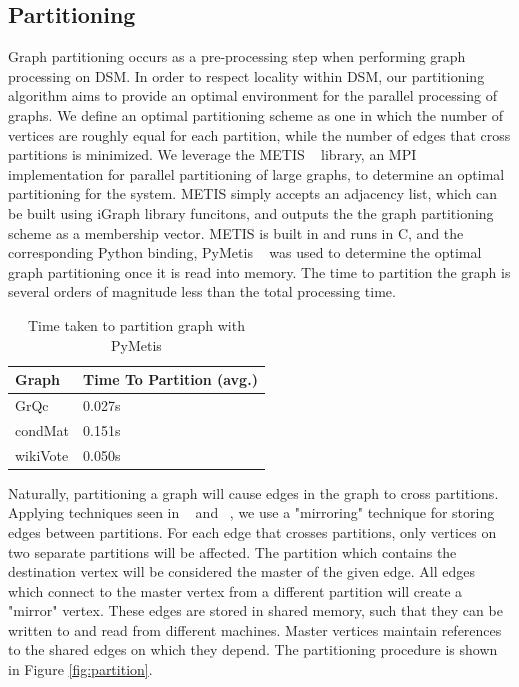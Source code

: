 \subsection{Partitioning}

Graph partitioning occurs as a pre-processing step when performing graph processing
on DSM. In order to respect locality within DSM, our partitioning algorithm aims to 
provide an optimal environment for the parallel processing of graphs. We define an 
optimal partitioning scheme as one in which the number of vertices are roughly 
equal for each partition, while the number of edges that cross partitions is 
minimized. We leverage the METIS ~\cite{Lasalle:2013:metis} library, an MPI 
implementation for parallel partitioning of large graphs, to determine an optimal 
partitioning for the system. METIS simply accepts an adjacency list, which can be 
built using iGraph library funcitons, and outputs the the graph partitioning
scheme as a membership vector. METIS is built in and runs in C, and the corresponding
Python binding, PyMetis ~\cite{pymetis} was used to determine the optimal graph 
partitioning once it is read into memory. The time to partition the graph is
several orders of magnitude less than the total processing time.

\begin{table}[h]
\begin{tabularx}{\linewidth}{|X|X|}
\hline
Graph & Time To Partition (avg.) \\ \hline \hline
GrQc & 0.027s \\ \hline
condMat & 0.151s \\ \hline
wikiVote & 0.050s \\ \hline
\end{tabularx}
\caption{Time taken to partition graph with PyMetis}
\end{table}

Naturally, partitioning a graph will cause edges in the graph to cross 
partitions. Applying techniques seen in ~\cite{Tian:2013:thinklikeagraph} and 
~\cite{Chen:2015:powerlyra}, we use a "mirroring" technique for storing edges
between partitions. For each edge that crosses partitions, only vertices on 
two separate partitions will be affected. The partition which contains the 
destination vertex will be considered the master of the given edge. All edges 
which connect to the master vertex from a different partition will create a
"mirror" vertex. These edges are stored in shared memory, such that they can
be written to and read from different machines. Master vertices maintain 
references to the shared edges on which they depend. The partitioning procedure
is shown in Figure \ref{fig:partition}.

